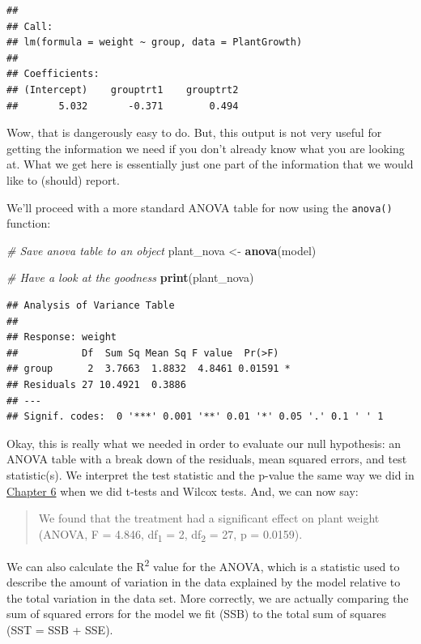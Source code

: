 \documentclass[
]{book}
\newenvironment{Shaded}{\begin{snugshade}}{\end{snugshade}}
\newcommand{\CommentTok}[1]{\textcolor[rgb]{0.56,0.35,0.01}{\textit{#1}}}
\newcommand{\KeywordTok}[1]{\textcolor[rgb]{0.13,0.29,0.53}{\textbf{#1}}}
\newcommand{\NormalTok}[1]{#1}
\newcommand{\StringTok}[1]{\textcolor[rgb]{0.31,0.60,0.02}{#1}}
\begin{document}
\begin{verbatim}
## 
## Call:
## lm(formula = weight ~ group, data = PlantGrowth)
## 
## Coefficients:
## (Intercept)    grouptrt1    grouptrt2  
##       5.032       -0.371        0.494
\end{verbatim}

Wow, that is dangerously easy to do. But, this output is not very useful for getting the information we need if you don't already know what you are looking at. What we get here is essentially just one part of the information that we would like to (should) report.

We'll proceed with a more standard ANOVA table for now using the \texttt{anova()} function:

\begin{Shaded}
\begin{Highlighting}[]
\CommentTok{# Save anova table to an object}
\NormalTok{plant_nova <-}\StringTok{ }\KeywordTok{anova}\NormalTok{(model)}

\CommentTok{# Have a look at the goodness}
\KeywordTok{print}\NormalTok{(plant_nova)}
\end{Highlighting}
\end{Shaded}

\begin{verbatim}
## Analysis of Variance Table
## 
## Response: weight
##           Df  Sum Sq Mean Sq F value  Pr(>F)  
## group      2  3.7663  1.8832  4.8461 0.01591 *
## Residuals 27 10.4921  0.3886                  
## ---
## Signif. codes:  0 '***' 0.001 '**' 0.01 '*' 0.05 '.' 0.1 ' ' 1
\end{verbatim}

Okay, this is really what we needed in order to evaluate our null hypothesis: an ANOVA table with a break down of the residuals, mean squared errors, and test statistic(s). We interpret the test statistic and the p-value the same way we did in \protect\hyperlink{Chapter6}{Chapter 6} when we did t-tests and Wilcox tests. And, we can now say:

\begin{quote}
We found that the treatment had a significant effect on plant weight
(ANOVA, F = 4.846, df\textsubscript{1} = 2, df\textsubscript{2} = 27, p = 0.0159).
\end{quote}

We can also calculate the R\textsuperscript{2} value for the ANOVA, which is a statistic used to describe the amount of variation in the data explained by the model relative to the total variation in the data set. More correctly, we are actually comparing the sum of squared errors for the model we fit (SSB) to the total sum of squares (SST = SSB + SSE).
\end{document}
